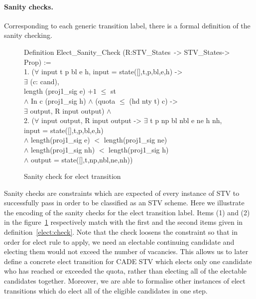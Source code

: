 \documentclass{llncs}
\begin{document}
\paragraph{Sanity checks.} 
Corresponding to each generic transition label, there is a formal definition of the sanity checking. 
\begin{scriptsize}
\begin{figure}[b]
{\selectfont
 Definition Elect\_Sanity\_Check (R:STV\_States~-> STV\_States-> Prop) :=\\
   1. ($\forall$ \textsf{input} t p bl e h, \textsf{input} = \textsf{state}([],t,p,bl,e,h) ->\\
    \hspace*{0.3cm} $\exists$ (c: cand),\\
    \hspace*{0.5cm} \textsf{length} (proj1\_sig e) $+ 1$  $\leq$ st \\
   \hspace*{0.5cm} $\wedge$ In c (proj1\_sig h) $\wedge$ (quota $\leq$ (hd nty t) c) -> \\
   \hspace*{1cm} $\exists$ \textsf{output}, R \textsf{input} \textsf{output}) $\wedge$\\
  2. ($\forall$ \textsf{input} \textsf{output}, R \textsf{input} \textsf{output} -> $\exists$ t p np bl nbl e ne h nh,\\
   \hspace*{0.3cm} \textsf{input} = \textsf{state}([],t,p,bl,e,h) \\
   \hspace*{0.45cm}$\wedge$ \textsf{length}(proj1\_sig e) $<$ \textsf{length}(proj1\_sig ne)\\ 
   \hspace*{0.45cm}$\wedge$ \textsf{length}(proj1\_sig nh) $<$ \textsf{length}(proj1\_sig h) \\
  \hspace*{0.5cm}$\wedge$ \textsf{output} = \textsf{state}([],t,np,nbl,ne,nh))
           
}
\caption{Sanity check for elect transition}
\label{fig;fig.2}
\end{figure}
\end{scriptsize}
Sanity checks are constraints which are expected of every instance of STV to successfully pass in order to be classified as an STV scheme. Here we illustrate the encoding of the sanity checks for the elect transition label. Items (1) and (2) in the figure~\ref{fig;fig.2} respectively match with the first and the second items given in definition~\ref{elect:check}. Note that the check loosens the constraint so that in order for elect rule to apply, we need an electable continuing candidate and electing them would not exceed the number of vacancies. This allows us to later define a concrete elect transition for CADE STV which elects only one candidate who has reached or exceeded the quota, rather than electing all of the electable candidates together. Moreover, we are able to formalise other instances of elect transitions which do elect all of the eligible candidates in one step. 
\end{document}

